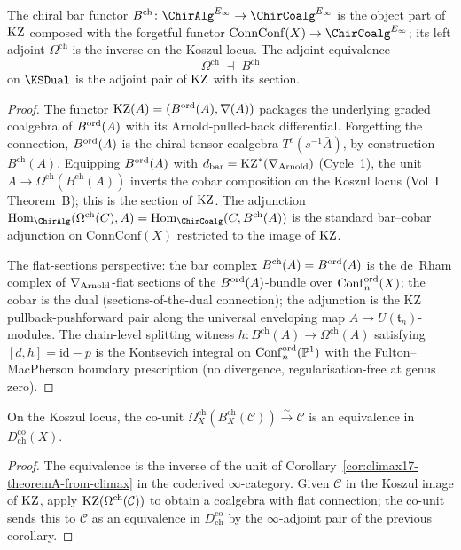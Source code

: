 \begin{corollary}[Theorem A]
\label{cor:climax17-theoremA-from-climax}
\ClaimStatusProvedHere
The chiral bar functor
$B^{\mathrm{ch}}\colon\ChirAlg^{E_\infty}\to\ChirCoalg^{E_\infty}$ is
the object part of $\mathrm{KZ}$ composed with the forgetful functor
$\mathrm{ConnConf}(X)\to\ChirCoalg^{E_\infty}$; its left adjoint
$\Omega^{\mathrm{ch}}$ is the inverse on the Koszul locus. The
adjoint equivalence
\[
  \Omega^{\mathrm{ch}}\;\dashv\;B^{\mathrm{ch}}
\]
on $\KSDual$ is the adjoint pair of $\mathrm{KZ}$ with its section.
\end{corollary}

\begin{proof}
The functor $\mathrm{KZ}(A)=(B^{\mathrm{ord}}(A),\nabla(A))$ packages the underlying
graded coalgebra of $B^{\mathrm{ord}}(A)$ with its Arnold-pulled-back differential.
Forgetting the connection, $B^{\mathrm{ord}}(A)$ is the chiral tensor coalgebra
$T^c(s^{-1}\bar A)$, by construction $B^{\mathrm{ch}}(A)$. Equipping
$B^{\mathrm{ord}}(A)$ with $d_{\mathrm{bar}}=\mathrm{KZ}^*(\nabla_{\mathrm{Arnold}})$ (Cycle~1), the unit
$A\to\Omega^{\mathrm{ch}}(B^{\mathrm{ch}}(A))$ inverts the cobar
composition on the Koszul locus (Vol~I Theorem~B); this is the section
of $\mathrm{KZ}$. The adjunction
$\Hom_{\ChirAlg}(\Omega^{\mathrm{ch}}(C),A)
=\Hom_{\ChirCoalg}(C,B^{\mathrm{ch}}(A))$ is the standard bar--cobar
adjunction on $\mathrm{ConnConf}(X)$ restricted to the image of $\mathrm{KZ}$.

The flat-sections perspective: the bar complex
$B^{\mathrm{ch}}(A)=B^{\mathrm{ord}}(A)$ is the de~Rham complex of
$\nabla_{\mathrm{Arnold}}$-flat sections of the $B^{\mathrm{ord}}(A)$-bundle over
$\operatorname{Conf}_n^{\mathrm{ord}}(X)$; the cobar is the dual (sections-of-the-dual
connection); the adjunction is the KZ pullback-pushforward pair along
the universal enveloping map $A\to U(\mathfrak{t}_n)$-modules. The
chain-level splitting witness $h\colon B^{\mathrm{ch}}(A)
\to\Omega^{\mathrm{ch}}(A)$ satisfying $[d,h]=\mathrm{id}-p$ is the
Kontsevich integral on $\operatorname{Conf}_n^{\mathrm{ord}}(\mathbb{P}^1)$ with the
Fulton--MacPherson boundary prescription (no divergence,
regularisation-free at genus zero).
\end{proof}

\begin{corollary}[Theorem B]
\label{cor:climax17-theoremB-from-climax}
\ClaimStatusProvedHere
On the Koszul locus, the co-unit
$\Omega^{\mathrm{ch}}_X(B^{\mathrm{ch}}_X(\mathcal{C}))\xrightarrow{\sim}
\mathcal{C}$ is an equivalence in $D^{\mathrm{co}}_{\mathrm{ch}}(X)$.
\end{corollary}

\begin{proof}
The equivalence is the inverse of the unit of
Corollary~\ref{cor:climax17-theoremA-from-climax} in the coderived
$\infty$-category. Given $\mathcal{C}$ in the Koszul image of $\mathrm{KZ}$,
apply $\mathrm{KZ}(\Omega^{\mathrm{ch}}(\mathcal{C}))$ to obtain a coalgebra
with flat connection; the co-unit sends this to $\mathcal{C}$ as an
equivalence in $D^{\mathrm{co}}_{\mathrm{ch}}$ by the $\infty$-adjoint
pair of the previous corollary.
\end{proof}

